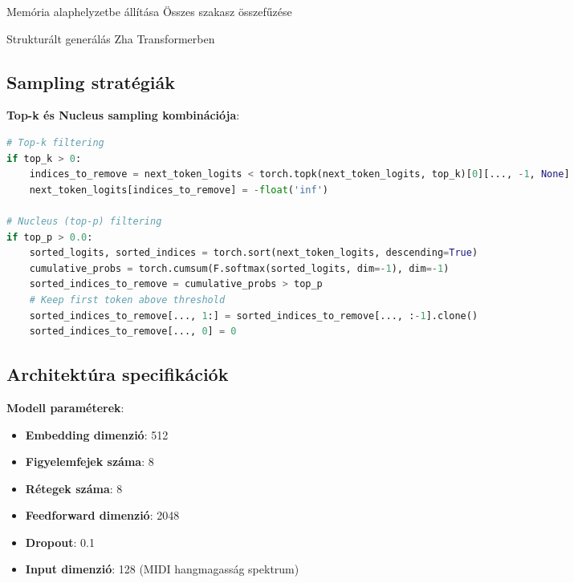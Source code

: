 \begin{algorithm}[H]
\SetAlgoLined
{}

Memória alaphelyzetbe állítása\;
Összes szakasz összefűzése\;

\caption{Strukturált generálás Zha Transformerben}
\end{algorithm}

\subsection{Sampling stratégiák}
\textbf{Top-k és Nucleus sampling kombinációja}:
\begin{lstlisting}[language=Python]
# Top-k filtering
if top_k > 0:
    indices_to_remove = next_token_logits < torch.topk(next_token_logits, top_k)[0][..., -1, None]
    next_token_logits[indices_to_remove] = -float('inf')

# Nucleus (top-p) filtering
if top_p > 0.0:
    sorted_logits, sorted_indices = torch.sort(next_token_logits, descending=True)
    cumulative_probs = torch.cumsum(F.softmax(sorted_logits, dim=-1), dim=-1)
    sorted_indices_to_remove = cumulative_probs > top_p
    # Keep first token above threshold
    sorted_indices_to_remove[..., 1:] = sorted_indices_to_remove[..., :-1].clone()
    sorted_indices_to_remove[..., 0] = 0
\end{lstlisting}

\subsection{Architektúra specifikációk}
\textbf{Modell paraméterek}:
\begin{itemize}
\item \textbf{Embedding dimenzió}: 512
\item \textbf{Figyelemfejek száma}: 8
\item \textbf{Rétegek száma}: 8
\item \textbf{Feedforward dimenzió}: 2048
\item \textbf{Dropout}: 0.1
\item \textbf{Input dimenzió}: 128 (MIDI hangmagasság spektrum)
\end{itemize}

